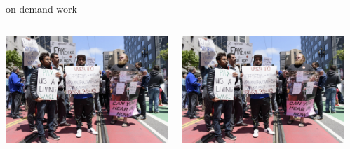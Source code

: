 \documentclass[presentation]{subfiles}
\begin{document}


\begin{frame}{on-demand work} %


\begin{columns}[onlytextwidth]
\begin{column}{0.3333333\textwidth}
\includegraphics[width=\textwidth]{figures/gigworkers_protesting.jpg}
\end{column}
\begin{column}{0.3333333\textwidth}
\includegraphics[width=\textwidth]{figures/gigworkers_protesting.jpg}
\end{column}
\begin{column}{0.3333333\textwidth}

\end{column}
\end{columns}
\end{frame}
\end{document}
